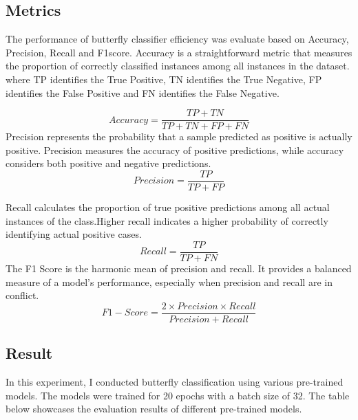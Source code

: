 \documentclass[10pt,twocolumn,letterpaper]{article}
\begin{document}
\subsection{Metrics} 
The performance of butterfly classifier efficiency was evaluate based on Accuracy, Precision, Recall and F1score. Accuracy is a straightforward metric that measures the proportion of correctly classified instances among all instances in the dataset. where TP identifies the True Positive, TN identifies the True Negative, FP identifies the False Positive and FN identifies the False Negative.

\begin{equation}
	Accuracy = \frac{TP+TN}{TP+TN+FP+FN}
\end{equation}
\indent Precision represents the probability that a sample predicted as positive is actually positive. Precision measures the accuracy of positive predictions, while accuracy considers both positive and negative predictions.
\begin{equation}
	Precision = \frac{TP}{TP+FP}
\end{equation}

\indent  Recall calculates the proportion of true positive predictions among all actual instances of the class.Higher recall indicates a higher probability of correctly identifying actual positive cases.
\begin{equation}
	Recall = \frac{TP}{TP+FN}
\end{equation}
\indent The F1 Score is the harmonic mean of precision and recall. It provides a balanced measure of a model's performance, especially when precision and recall are in conflict.
\begin{equation}
	F1-Score = \frac{2\times Precision\times Recall}{Precision+Recall}
\end{equation}




\subsection{Result} 
In this experiment, I conducted butterfly classification using various pre-trained models. The models were trained for 20 epochs with a batch size of 32.
The table below showcases the evaluation results of different pre-trained models. \\
\end{document}

